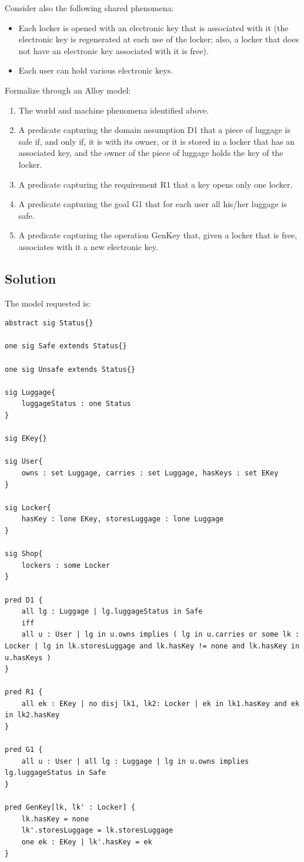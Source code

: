 \documentclass[12pt, a4paper]{report}
\begin{document}
        Consider also the following shared phenomena:
        \begin{itemize}
            \item Each locker is opened with an electronic key that is associated with it (the electronic key is regenerated at each use of the locker; also, a locker that does not have an electronic key associated with it is free).
            \item Each user can hold various electronic keys. 
        \end{itemize}

        Formalize through an Alloy model:
        \begin{enumerate}
            \item The world and machine phenomena identified above.
            \item A predicate capturing the domain assumption D1 that a piece of luggage is safe if, and only if, it is with its owner, or it is stored in a locker that has an associated key, and the owner of the piece of luggage holds the key of the locker.
            \item A predicate capturing the requirement R1 that a key opens only one locker.
            \item A predicate capturing the goal G1 that for each user all his/her luggage is safe.
            \item A predicate capturing the operation GenKey that, given a locker that is free, associates with it a new electronic key.
        \end{enumerate}
    \subsection*{Solution}
        The model requested is: 
        \begin{lstlisting}[language=alloy]
abstract sig Status{}

one sig Safe extends Status{} 

one sig Unsafe extends Status{}

sig Luggage{
    luggageStatus : one Status
}

sig EKey{}

sig User{
    owns : set Luggage, carries : set Luggage, hasKeys : set EKey
}

sig Locker{
    hasKey : lone EKey, storesLuggage : lone Luggage
}

sig Shop{
    lockers : some Locker
}

pred D1 {
    all lg : Luggage | lg.luggageStatus in Safe 
    iff 
    all u : User | lg in u.owns implies ( lg in u.carries or some lk : Locker | lg in lk.storesLuggage and lk.hasKey != none and lk.hasKey in u.hasKeys )
}

pred R1 {
    all ek : EKey | no disj lk1, lk2: Locker | ek in lk1.hasKey and ek in lk2.hasKey
}

pred G1 {
    all u : User | all lg : Luggage | lg in u.owns implies lg.luggageStatus in Safe
}

pred GenKey[lk, lk' : Locker] {
    lk.hasKey = none
    lk'.storesLuggage = lk.storesLuggage
    one ek : EKey | lk'.hasKey = ek 
}
        \end{lstlisting}
\end{document}
